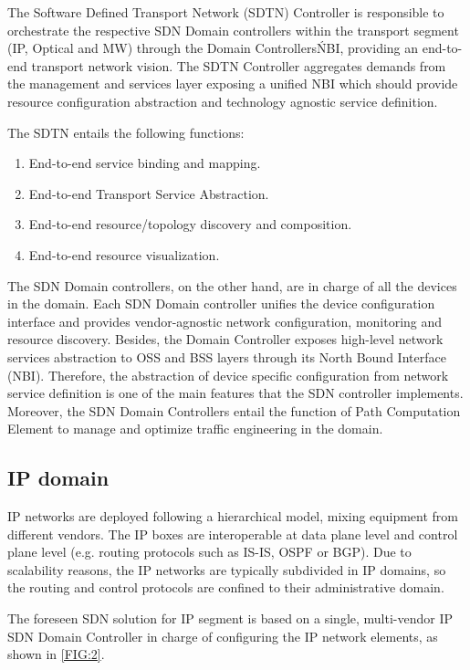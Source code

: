 \documentclass[a4paper,fleqn]{cas-dc}
\begin{document}
The Software Defined Transport Network (SDTN) Controller is responsible to orchestrate the respective SDN Domain controllers within the transport segment (IP, Optical and MW) through the Domain Controllers\'NBI, providing an end-to-end transport network vision. The SDTN Controller aggregates demands from the management and services layer exposing a unified NBI which should provide resource configuration abstraction and technology agnostic service definition. 

The SDTN entails the following functions: 
\begin{enumerate}
    \item End-to-end service binding and mapping.
    \item End-to-end Transport Service Abstraction.
    \item End-to-end resource/topology discovery and composition.
    \item End-to-end resource visualization.
\end{enumerate}

The SDN Domain controllers, on the other hand, are in charge of all the devices in the domain. Each SDN Domain controller unifies the device configuration interface and provides vendor-agnostic network configuration, monitoring and resource discovery. Besides, the Domain Controller exposes high-level network services abstraction to OSS and BSS layers through its North Bound Interface (NBI). Therefore, the abstraction of device specific configuration from network service definition is one of the main features that the SDN controller implements. Moreover, the SDN Domain Controllers entail the function of Path Computation Element to manage and optimize traffic engineering in the domain.

\subsection {IP domain}
\label{section:ip}
IP networks are deployed following a hierarchical model, mixing equipment from different vendors. The IP boxes are interoperable at data plane level and control plane level (e.g. routing protocols such as IS-IS, OSPF or BGP). Due to scalability reasons, the IP networks are typically subdivided in IP domains, so the routing and control protocols are confined to their administrative domain.

The foreseen SDN solution for IP segment is based on a single, multi-vendor IP SDN Domain Controller in charge of configuring the IP network elements, as shown in \ref{FIG:2}.
\end{document}
